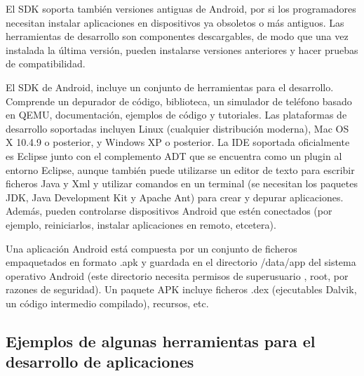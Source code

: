 El \ac{SDK} soporta tambi\'en versiones antiguas de Android, por si los programadores necesitan instalar aplicaciones en dispositivos ya obsoletos o m\'as antiguos. Las herramientas de desarrollo son componentes descargables, de modo que una vez instalada la \'ultima versi\'on, pueden instalarse versiones anteriores y hacer pruebas de compatibilidad.

El \ac{SDK} de Android, incluye un conjunto de herramientas para el desarrollo. Comprende un depurador de c\'odigo, biblioteca, un simulador de tel\'efono basado en QEMU, documentaci\'on, ejemplos de c\'odigo y tutoriales. Las plataformas de desarrollo soportadas incluyen Linux (cualquier distribuci\'on moderna), Mac OS X\Si{\texttrademark} 10.4.9 o posterior, y Windows XP\Si{\texttrademark} o posterior. La \ac{IDE} soportada oficialmente es Eclipse\Si{\texttrademark} junto con el complemento \ac{ADT} que se encuentra como un plugin al entorno Eclipse\Si{\texttrademark}, aunque tambi\'en puede utilizarse un editor de texto para escribir ficheros Java y Xml y utilizar comandos en un terminal (se necesitan los paquetes JDK, Java Development Kit y Apache Ant) para crear y depurar aplicaciones. Adem\'as, pueden controlarse dispositivos Android que est\'en conectados (por ejemplo, reiniciarlos, instalar aplicaciones en remoto, etcetera).~\cite{wiki.sdk}

Una aplicación Android est\'a compuesta por un conjunto de ficheros empaquetados en formato .apk y guardada en el directorio /data/app del sistema operativo Android (este directorio necesita permisos de superusuario , root, por razones de seguridad). Un paquete APK incluye ficheros .dex (ejecutables Dalvik, un c\'odigo intermedio compilado), recursos, etc.

\subsection{Ejemplos de algunas herramientas para el desarrollo de aplicaciones}
\label{subsec:android.tools.examples.1}

